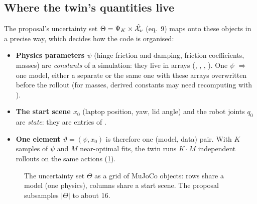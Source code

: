 \subsection{Where the twin's quantities live}
The proposal's uncertainty set $\Theta=\Psi_K\times\hat{\mathcal X}_\nu$ (eq.~9) maps onto these objects in a precise way, which decides how the code is organised:
\begin{itemize}
\item \textbf{Physics parameters $\psi$} (hinge friction and damping, friction coefficients, masses) are \emph{constants} of a simulation: they live in  arrays (, , , ). One $\psi$ $\Rightarrow$ one model, either a separate  or the same one with these arrays overwritten before the rollout (for masses, derived constants may need recomputing with  \chk).
\item \textbf{The start scene $x_0$} (laptop position, yaw, lid angle) and the robot joints $q_0$ are \emph{state}: they are entries of .
\item \textbf{One element $\vartheta=(\psi,x_0)$} is therefore one (model, data) pair. With $K$ samples of $\psi$ and $M$ near-optimal fits, the twin runs $K\cdot M$ independent rollouts on the same actions (\cref{twin:fig:theta}).
\end{itemize}

\begin{figure}[h]
\centering

\caption{The uncertainty set $\Theta$ as a grid of MuJoCo objects: rows share a model (one physics), columns share a start scene. The proposal subsamples $|\Theta|$ to about 16.}
\label{twin:fig:theta}
\end{figure}

